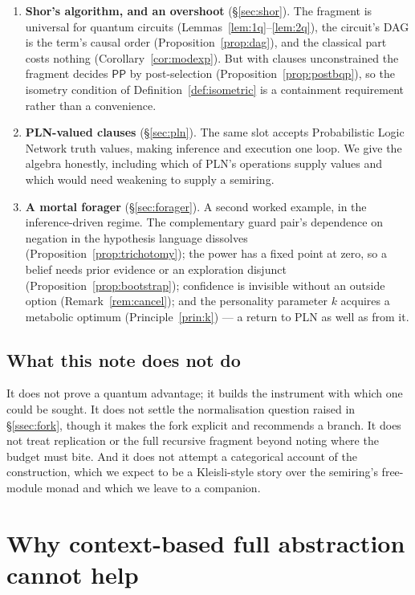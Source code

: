\documentclass[11pt,a4paper]{article}
\theoremstyle{plain}
\theoremstyle{definition}
\theoremstyle{remark}
\begin{document}
\begin{enumerate}[leftmargin=1.4em,itemsep=3pt]
\item \textbf{Shor's algorithm, and an overshoot} (\S\ref{sec:shor}). The
fragment is universal for quantum circuits (Lemmas~\ref{lem:1q}--\ref{lem:2q}),
the circuit's DAG is the term's causal order (Proposition~\ref{prop:dag}), and
the classical part costs nothing (Corollary~\ref{cor:modexp}). But with clauses
unconstrained the fragment decides $\mathsf{PP}$ by post-selection
(Proposition~\ref{prop:postbqp}), so the isometry condition of
Definition~\ref{def:isometric} is a containment requirement rather than a
convenience.

\item \textbf{PLN-valued clauses} (\S\ref{sec:pln}). The same slot accepts
Probabilistic Logic Network truth values, making inference and execution one
loop. We give the algebra honestly, including which of PLN's operations supply
values and which would need weakening to supply a semiring.

\item \textbf{A mortal forager} (\S\ref{sec:forager}). A second worked example,
in the inference-driven regime. The complementary guard pair's dependence on
negation in the hypothesis language dissolves
(Proposition~\ref{prop:trichotomy}); the power has a fixed point at zero, so a
belief needs prior evidence or an exploration disjunct
(Proposition~\ref{prop:bootstrap}); confidence is invisible without an outside
option (Remark~\ref{rem:cancel}); and the personality parameter $k$ acquires a
metabolic optimum (Principle~\ref{prin:k}) --- a return to PLN as well as from it.
\end{enumerate}

\subsection{What this note does not do}

It does not prove a quantum advantage; it builds the instrument with which one
could be sought. It does not settle the normalisation question raised in
\S\ref{ssec:fork}, though it makes the fork explicit and recommends a branch. It
does not treat replication or the full recursive fragment beyond noting where the
budget must bite. And it does not attempt a categorical account of the
construction, which we expect to be a Kleisli-style story over the semiring's
free-module monad and which we leave to a companion.

\section{Why context-based full abstraction cannot help}\label{sec:fa}
\end{document}
